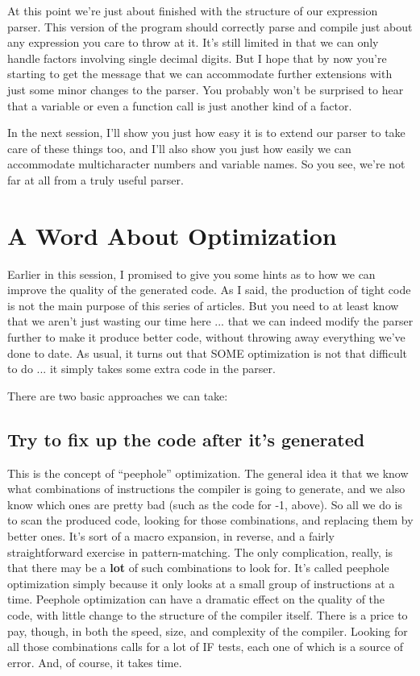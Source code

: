 At this point we're just about finished with the structure of our expression parser. This version of the program should correctly parse and compile just about any expression you care to  throw at it. It's still limited in that  we  can  only  handle  factors involving single decimal digits. But I hope that by now you're starting  to  get  the  message  that we can  accommodate  further extensions  with  just  some  minor  changes to the parser. You probably won't be  surprised  to  hear  that a variable or even a function call is just another kind of a factor.

In  the next session, I'll show you just how easy it is to extend our parser to take care of  these  things too, and I'll also show you just  how easily we can accommodate multicharacter numbers and variable names. So you see, we're  not  far at all from a truly useful parser.

\section{A Word About Optimization}

Earlier in this session, I promised to give you some hints  as to how we can improve the quality of the generated code. As I said, the  production of tight code is not the  main  purpose  of  this series of articles. But you need to at least know that we aren't just  wasting our time here ... that we  can  indeed  modify  the parser further to  make  it produce better code, without throwing away everything we've done to date. As usual, it turns  out that SOME optimization is not that difficult to do ... it simply takes some extra code in the parser.

There are two basic approaches we can take:

\subsection{Try to fix up the code after it's generated}

This is  the concept of ``peephole'' optimization. The general idea it that we  know  what  combinations of instructions the compiler  is  going  to generate, and we also know which ones are pretty bad (such as the code for -1, above). So all we do  is  to   scan   the  produced  code, looking  for  those combinations, and replacing  them  by better ones. It's sort of   a   macro   expansion, in   reverse, and   a  fairly straightforward  exercise  in   pattern-matching. The  only complication, really, is that there may be  a {\bfseries lot}  of  such combinations to look for. It's called  peephole optimization simply because it only looks at a small group of instructions at a time. Peephole  optimization can have a dramatic effect on  the  quality  of the code, with  little  change  to  the structure of the compiler  itself. There is a price to pay, though, in  both  the  speed, size, and complexity of  the compiler. Looking for all those combinations calls for a lot of IF tests, each one of which is a source of error. And, of course, it takes time.

